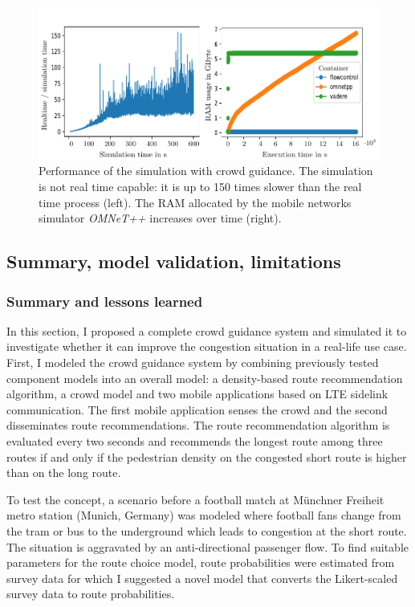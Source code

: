 \begin{figure}[hbt!]
\includegraphics[width=\textwidth]{../figures/investigation/RealisticScenario/PerformanceEval/performanceeval.pdf} 
\caption[Performance of the simulation with crowd guidance]{Performance of the simulation with crowd guidance. The simulation is not real time capable: it is up to 150 times slower than the real time process (left). The RAM allocated by the mobile networks simulator \textit{OMNeT++} increases over time (right).}
\label{fig:performance}
\end{figure}

\subsection{Summary, model validation, limitations}

\subsubsection{Summary and lessons learned}

In this section, I proposed a complete crowd guidance system and simulated it to investigate whether it can improve the congestion situation in a real-life use case. 
First, I modeled the crowd guidance system by combining previously tested component models into an overall model: a density-based route recommendation algorithm, a crowd model and two mobile applications based on LTE sidelink communication. 
The first mobile application senses the crowd and the second disseminates route recommendations. 
The route recommendation algorithm is evaluated every two seconds and recommends the longest route among three routes if and only if the pedestrian density on the congested short route is higher than on the long route. 

To test the concept, a scenario before a football match at Münchner Freiheit metro station (Munich, Germany) was modeled where football fans change from the tram or bus to the underground which leads to congestion at the short route. The situation is aggravated by an anti-directional passenger flow. 
To find suitable parameters for the route choice model, route probabilities were estimated from survey data for which I suggested a novel model that converts the Likert-scaled survey data to route probabilities. 

